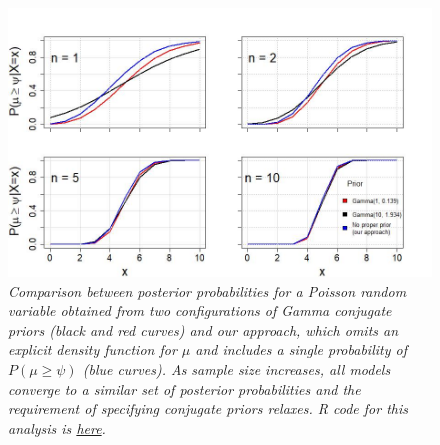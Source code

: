 \documentclass[
]{article}
\begin{document}
\begin{figure}
\centering
\includegraphics{Figures/Fig2Post.jpeg}
\caption{\emph{Comparison between posterior probabilities for a Poisson
random variable obtained from two configurations of Gamma conjugate
priors (black and red curves) and our approach, which omits an explicit
density function for \(\mu\) and includes a single probability of
\(P(\mu \ge \psi)\) (blue curves). As sample size increases, all models
converge to a similar set of posterior probabilities and the requirement
of specifying conjugate priors relaxes. R code for this analysis is
\href{https://github.com/rincondf/STBP/blob/403d7b559543d0f1f33097755c0dc253affbe5ea/Comparison_priors.R}{here}.}}
\end{figure}
\end{document}
